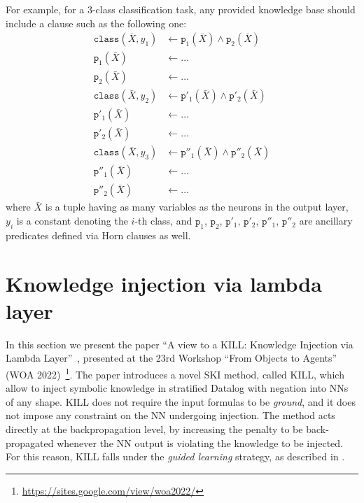 For example, for a 3-class classification task, any provided knowledge base should include a clause such as the following one:
%
\begin{align*}
    \texttt{class}(\bar{X}, y_1) &\leftarrow \texttt{p}_1(\bar{X}) \land \texttt{p}_2(\bar{X}) \\
    \texttt{p}_1(\bar{X}) &\leftarrow \dots \\
    \texttt{p}_2(\bar{X}) &\leftarrow \dots \\
    \texttt{class}(\bar{X}, y_2) &\leftarrow \texttt{p}'_1(\bar{X}) \land \texttt{p}'_2(\bar{X}) \\
    \texttt{p}'_1(\bar{X}) &\leftarrow \dots \\
    \texttt{p}'_2(\bar{X}) &\leftarrow \dots \\
    \texttt{class}(\bar{X}, y_3) &\leftarrow \texttt{p}''_1(\bar{X}) \land \texttt{p}''_2(\bar{X}) \\
    \texttt{p}''_1(\bar{X}) &\leftarrow \dots \\
    \texttt{p}''_2(\bar{X}) &\leftarrow \dots
\end{align*}
%
where \(\bar{X}\) is a tuple having as many variables as the neurons in the output layer, \(y_i\) is a constant denoting the \(i\)-th class, and \(\texttt{p}_1\), \(\texttt{p}_2\), \(\texttt{p}'_1\), \(\texttt{p}'_2\), \(\texttt{p}''_1\), \(\texttt{p}''_2\) are ancillary predicates defined via Horn clauses as well.


\section{Knowledge injection via lambda layer}\label{sec:ski-contribution-kill}
%
In this section we present the paper ``A view to a KILL: Knowledge Injection via Lambda Layer''~\cite{kill-woa2022}, presented at the 23rd Workshop ``From Objects to Agents'' (WOA 2022)~\footnote{\url{https://sites.google.com/view/woa2022/}}.
%
The paper introduces a novel \gls{SKI} method, called \gls{KILL}, which allow to inject symbolic knowledge in stratified Datalog with negation into \glspl{NN} of any shape.
%
\Gls{KILL} does not require the input formulas to be \emph{ground}, and it does not impose any constraint on the \gls{NN} undergoing injection.
%
The method acts directly at the backpropagation level, by increasing the penalty to be back-propagated whenever the \gls{NN} output is violating the knowledge to be injected.
%
For this reason, \gls{KILL} falls under the \emph{guided learning} strategy, as described in .


